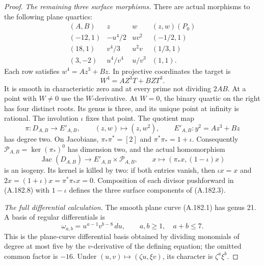 \begin{proof}
\emph{The remaining three surface morphisms.}
There are actual morphisms to the following plane quartics:
\[
\begin{array}{c|c|c|c}
(A,B)&z&w&(z,w)(P_0)\\ \hline
(-12,1)&-u^4/2&uv^2&(-1/2,1)\\
(18,1)&v^4/3&u^2v&(1/3,1)\\
(3,-2)&u^4/v^4&u/v^3&(1,1).
\end{array}
\tag{A.182.8}
\]
Each row satisfies \(w^4=Az^3+Bz\).  In projective coordinates
the target is
\[
                      W^4=AZ^3T+BZT^3.
\tag{A.182.9}
\]
It is smooth in characteristic zero and at every prime not
dividing \(2AB\).  At a point with \(W\ne0\) use the
\(W\)-derivative.  At \(W=0\), the binary quartic on the right
has four distinct roots.  Its genus is three, and its unique point
at infinity is rational.  The involution \(\iota\) fixes that
point.  The quotient map
\[
       \pi:D_{A,B}\longrightarrow E'_{A,B},\qquad
       (z,w)\longmapsto(z,w^2),\qquad
       E'_{A,B}:y^2=Az^3+Bz
\tag{A.182.10}
\]
has degree two.  On Jacobians,
\(\pi_*\pi^*=[2]\) and
\(\pi^*\pi_*=1+\iota\).  Consequently
\(\mathcal P_{A,B}=\ker(\pi_*)^0\) has dimension two, and
the actual homomorphism
\[
 \operatorname{Jac}(D_{A,B})\longrightarrow
       E'_{A,B}\times\mathcal P_{A,B},\qquad
                 x\longmapsto(\pi_*x,(1-\iota)x)
\tag{A.182.11}
\]
is an isogeny.  Its kernel is killed by two: if both entries
vanish, then \(\iota x=x\) and
\(2x=(1+\iota)x=\pi^*\pi_*x=0\).
Composition of each divisor pushforward in (A.182.8) with
\(1-\iota\) defines the three surface components of (A.182.3).

\emph{The full differential calculation.}
The smooth plane curve (A.182.1) has genus 21.  A basis of regular
differentials is
\[
 \omega_{a,b}=u^{a-1}v^{b-8}\,du,
          \qquad a,b\geq1,\quad a+b\leq7.
\tag{A.182.12}
\]
This is the plane-curve differential basis obtained by dividing
monomials of degree at most five by the \(v\)-derivative of the
defining equation; the omitted common factor is \(-16\).
Under \((u,v)\mapsto(\zeta u,\xi v)\), its character is
\(\zeta^a\xi^b\).


\end{proof}
